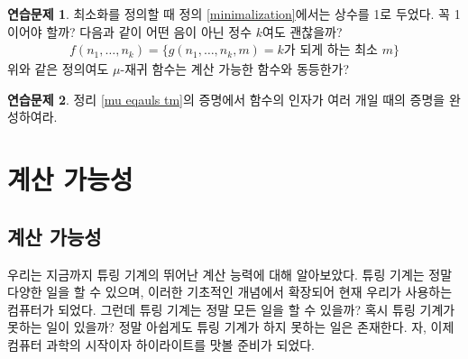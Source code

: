 \documentclass[b5paper, 11pt]{book}
\theoremstyle{definition}
\newtheorem{ec}{연습문제}[chapter]
\begin{document}
\begin{ec}
    최소화를 정의할 때 정의 \ref{minimalization}에서는 상수를 1로 두었다. 꼭 1이어야 할까? 다음과 같이 어떤 음이 아닌 정수 $k$여도 괜찮을까?
    \begin{align*}
        f(n_1, \ldots, n_k) = \{g(n_1, \ldots, n_k, m) = k\text{가 되게 하는 최소 } m\}
    \end{align*}
    위와 같은 정의여도 $\mu$-재귀 함수는 계산 가능한 함수와 동등한가?
\end{ec}
\begin{ec}\label{several mu}
    정리 \ref{mu eqauls tm}의 증명에서 함수의 인자가 여러 개일 때의 증명을 완성하여라.
\end{ec}
\part{계산 가능성}
\chapter{계산 가능성}
우리는 지금까지 튜링 기계의 뛰어난 계산 능력에 대해 알아보았다. 튜링 기계는 정말 다양한 일을 할 수 있으며,
이러한 기초적인 개념에서 확장되어 현재 우리가 사용하는 컴퓨터가 되었다. 그런데 튜링 기계는 정말 모든 일을
할 수 있을까? 혹시 튜링 기계가 못하는 일이 있을까? 정말 아쉽게도 튜링 기계가 하지 못하는 일은 존재한다.
자, 이제 컴퓨터 과학의 시작이자 하이라이트를 맛볼 준비가 되었다.
\end{document}
